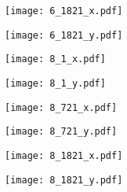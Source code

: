 \documentclass[8pt]{beamer}
\begin{document}
\begin{frame}
\center
\texttt{[image: 6\_1821\_x.pdf]}
\end{frame}
\begin{frame}
\center
\texttt{[image: 6\_1821\_y.pdf]}
\end{frame}
\begin{frame}
\center
\texttt{[image: 8\_1\_x.pdf]}
\end{frame}
\begin{frame}
\center
\texttt{[image: 8\_1\_y.pdf]}
\end{frame}
\begin{frame}
\center
\texttt{[image: 8\_721\_x.pdf]}
\end{frame}
\begin{frame}
\center
\texttt{[image: 8\_721\_y.pdf]}
\end{frame}
\begin{frame}
\center
\texttt{[image: 8\_1821\_x.pdf]}
\end{frame}
\begin{frame}
\center
\texttt{[image: 8\_1821\_y.pdf]}
\end{frame}
\end{document}
